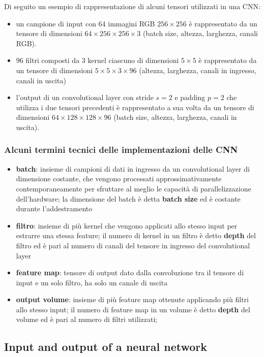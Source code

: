 Di seguito un esempio di rappresentazione di alcuni tensori utilizzati in una CNN:
\begin{itemize}
	\item un campione di input con 64 immagini RGB \(256 \times 256\) è rappresentato da un tensore di dimensioni
	\(64 \times 256 \times 256 \times 3\) (batch size, altezza, larghezza, canali RGB).
	\item 96 filtri composti da 3 kernel ciascuno di dimensioni \(5 \times 5\) è rappresentato da un tensore di dimensioni
	\(5 \times 5 \times 3 \times 96\) (altezza, larghezza, canali in ingresso, canali in uscita)
	\item l'output di un convolutional layer con stride \(s = 2\) e padding \(p = 2\) che utilizza i due tensori precedenti
	è rappresentato a sua volta da un tensore di dimensioni \(64 \times 128 \times 128 \times 96\) (batch size, altezza, larghezza, canali in uscita).
\end{itemize}

\subsubsection*{Alcuni termini tecnici delle implementazioni delle CNN}
\begin{itemize}
	\item \textbf{batch}: insieme di campioni di dati in ingresso da un convolutional layer di dimensione costante, che
	vengono processati approssimativamente contemporaneamente per sfruttare al meglio le capacità di parallelizzazione
	dell'hardware; la dimensione del batch è detta \textbf{batch size} ed è costante durante l'addestramento
	\item \textbf{filtro}: insieme di più kernel che vengono applicati allo stesso input per estrarre una stessa feature;
	il numero di kernel in un filtro è detto \textbf{depth} del filtro ed è pari al numero di canali del tensore in
	ingresso del convolutional layer
	\item \textbf{feature map}: tensore di output dato dalla convoluzione tra il tensore di input e un solo filtro, ha solo
	un canale di uscita
	\item \textbf{output volume}: insieme di più feature map ottenute applicando più filtri allo stesso input; il numero di feature
	map in un volume è detto \textbf{depth} del volume ed è pari al numero di filtri utilizzati;
\end{itemize}

\newpage

\subsection{Input and output of a neural network}
